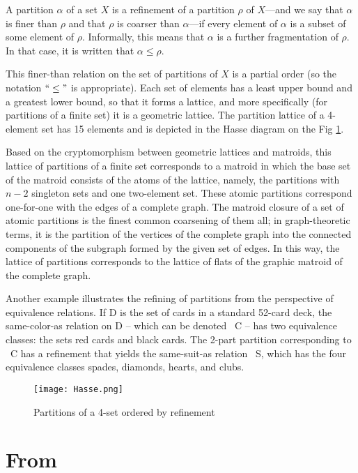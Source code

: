 \begin{definition}
	A partition $\alpha$ of a set $X$ is a refinement of a partition $\rho$ of $X$—and we say that $\alpha$ is finer than $\rho$ and that $\rho$ is coarser than $\alpha$—if every element of $\alpha$ is a subset of some element of $\rho$. Informally, this means that $\alpha$ is a further fragmentation of $\rho$. In that case, it is written that $\alpha\le\rho$.
	
	This finer-than relation on the set of partitions of $X$ is a partial order (so the notation $``\le"$ is appropriate). Each set of elements has a least upper bound and a greatest lower bound, so that it forms a lattice, and more specifically (for partitions of a finite set) it is a geometric lattice. The partition lattice of a 4-element set has 15 elements and is depicted in the Hasse diagram on the Fig \ref{fig:Hasse}.
	
	Based on the cryptomorphism between geometric lattices and matroids, this lattice of partitions of a finite set corresponds to a matroid in which the base set of the matroid consists of the atoms of the lattice, namely, the partitions with $n-2$ singleton sets and one two-element set. These atomic partitions correspond one-for-one with the edges of a complete graph. The matroid closure of a set of atomic partitions is the finest common coarsening of them all; in graph-theoretic terms, it is the partition of the vertices of the complete graph into the connected components of the subgraph formed by the given set of edges. In this way, the lattice of partitions corresponds to the lattice of flats of the graphic matroid of the complete graph.
	
	Another example illustrates the refining of partitions from the perspective of equivalence relations. If D is the set of cards in a standard 52-card deck, the same-color-as relation on D – which can be denoted ~C – has two equivalence classes: the sets {red cards} and {black cards}. The 2-part partition corresponding to ~C has a refinement that yields the same-suit-as relation ~S, which has the four equivalence classes {spades}, {diamonds}, {hearts}, and {clubs}.
	
	\begin{figure}[htbp]
		\texttt{[image: Hasse.png]}
		\caption{Partitions of a 4-set ordered by refinement}
		\label{fig:Hasse}
	\end{figure}
\end{definition}

\section{From \cite{Kenneth2012}}


